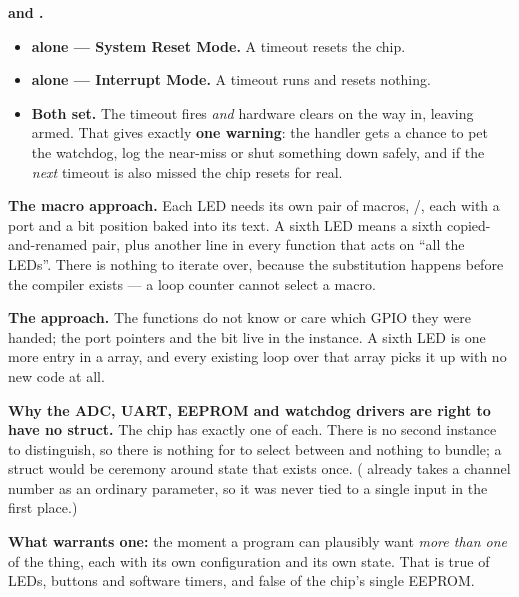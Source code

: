 \textbf{ and .} 
\begin{itemize}
  \item \textbf{ alone --- System Reset Mode.} A timeout resets the chip.
  \item \textbf{ alone --- Interrupt Mode.} A timeout runs  and
    resets nothing.
  \item \textbf{Both set.} The timeout fires  \emph{and} hardware clears
     on the way in, leaving  armed. That gives exactly \textbf{one warning}:
    the handler gets a chance to pet the watchdog, log the near-miss or shut something down safely,
    and if the \emph{next} timeout is also missed the chip resets for real.
\end{itemize}


\textbf{The macro approach.} Each LED needs its own pair of macros, /,
each with a port and a bit position baked into its text. A sixth LED means a sixth
copied-and-renamed pair, plus another line in every function that acts on ``all the LEDs''. There is
nothing to iterate over, because the substitution happens before the compiler exists --- a loop
counter cannot select a macro. 

\textbf{The  approach.} The functions do not know or care which GPIO they were handed;
the port pointers and the bit live in the instance. A sixth LED is one more entry in a
 array, and every existing loop over that array picks it up with no new code at
all. 

\textbf{Why the ADC, UART, EEPROM and watchdog drivers are right to have no struct.} The chip has
exactly one of each. There is no second instance to distinguish, so there is nothing for
 to select between and nothing to bundle; a struct would be ceremony around state that
exists once. ( already takes a channel number as an ordinary parameter, so it was
never tied to a single input in the first place.)

\textbf{What warrants one:} the moment a program can plausibly want \emph{more than one} of the
thing, each with its own configuration and its own state. That is true of LEDs, buttons and
software timers, and false of the chip's single EEPROM. 

